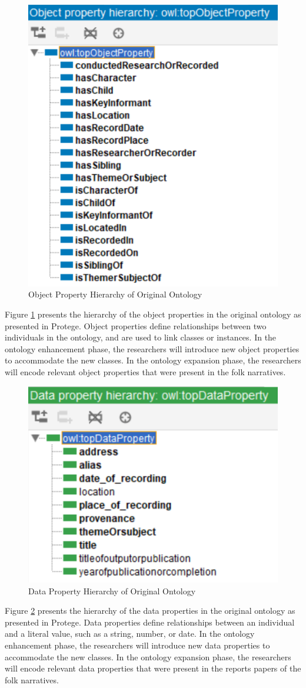 \begin{figure}[H]
    \centering
    \includegraphics[width=0.5\linewidth]{figures/Object Property Hierarchy of Original Ontology.png}
    \caption{Object Property Hierarchy of Original Ontology}
    \label{fig:object property hierarchy}
\end{figure}

Figure \ref{fig:object property hierarchy} presents the hierarchy of the object properties in the original ontology as presented in Protege. Object properties define relationships between two individuals in the ontology, and are used to link classes or instances. In the ontology enhancement phase, the researchers will introduce new object properties to accommodate the new classes. In the ontology expansion phase, the researchers will encode relevant object properties that were present in the folk narratives.

\begin{figure}[H]
    \centering
    \includegraphics[width=0.5\linewidth]{figures/Data Property Hierarchy of Original Ontology.png}
    \caption{Data Property Hierarchy of Original Ontology}
    \label{fig:data property hierarchy}
\end{figure}

Figure \ref{fig:data property hierarchy} presents the hierarchy of the data properties in the original ontology as presented in Protege. Data properties define relationships between an individual and a literal value, such as a string, number, or date.  In the ontology enhancement phase, the researchers will introduce new data properties to accommodate the new classes. In the ontology expansion phase, the researchers will encode relevant data properties that were present in the reports papers of the folk narratives.



